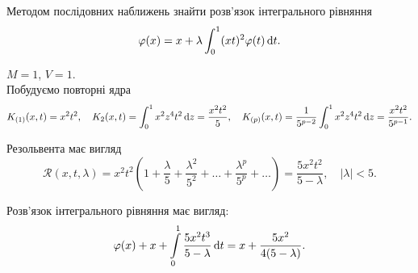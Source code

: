\begin{example}
	Методом послідовних наближень знайти розв’язок інтегрального рівняння \[\varphi(x) = x + \lambda \int_0^1 (xt)^2 \varphi(t) \mathop{}\!\mathrm{d} t.\]
\end{example}
\begin{solution*}
	$M = 1$, $V = 1$. \\

	Побудуємо повторні ядра \[ K_{(1)}(x, t) = x^2t^2, \quad K_2(x, t) = \int_0^1 x^2 z^4 t^2 \mathop{}\!\mathrm{d} z = \frac{x^2t^2}{5}, \quad K_{(p)}(x, t) = \frac{1}{5^{p - 2}} \int_0^1 x^2 z^4 t^2 \mathop{}\!\mathrm{d} z = \frac{x^2t^2}{5^{p - 1}}. \]
	
	Резольвента має вигляд \[\mathcal{R}(x, t, \lambda) = x^2 t^2 \left(1 + \frac{\lambda}{5} + \frac{\lambda^2}{5^2} + \ldots + \frac{\lambda^p}{5^p} + \ldots \right) = \frac{5x^2t^2}{5 - \lambda}, \quad |\lambda| < 5. \]

	Розв’язок інтегрального рівняння має вигляд: \[ \varphi(x) + x + \displaystyle\int\limits_0^1 \dfrac{5x^2t^3}{5 - \lambda} \mathop{}\!\mathrm{d} t = x + \dfrac{5x^2}{4(5 - \lambda)}. \]
\end{solution*}